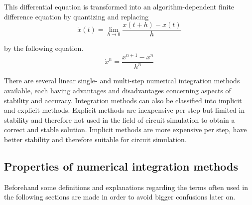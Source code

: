 This differential equation is transformed into an algorithm-dependent
finite difference equation by quantizing and replacing
\begin{equation}
\dot{x}(t) = \lim_{h \rightarrow 0} \dfrac{x(t+h) - x(t)}{h}
\end{equation}

by the following equation.
\begin{equation}
\dot{x}^n = \dfrac{x^{n+1} - x^{n}}{h^{n}}
\end{equation}

There are several linear single- and multi-step numerical integration
methods available, each having advantages and disadvantages concerning
aspects of stability and accuracy.  Integration methods can also be
classified into implicit and explicit methods.  Explicit methods are
inexpensive per step but limited in stability and therefore not used
in the field of circuit simulation to obtain a correct and stable
solution.  Implicit methods are more expensive per step, have better
stability and therefore suitable for circuit simulation.

\subsection{Properties of numerical integration methods}

Beforehand some definitions and explanations regarding the terms often
used in the following sections are made in order to avoid bigger
confusions later on.

